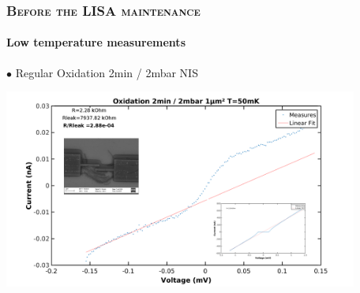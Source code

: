 \documentclass{beamer}
\begin{document}
    \begin{frame}[allowframebreaks]
        \frametitle{\textsc{Before the LISA maintenance}}
        \framesubtitle{Low temperature measurements}

        $\bullet$ Regular Oxidation 2min / 2mbar NIS
        \vspace{0.3cm}
        
        \includegraphics[width=330pt]{BeforeLISAOx.png}
%         
%         
        
        
        
        
    \end{frame}
    
\end{document}
